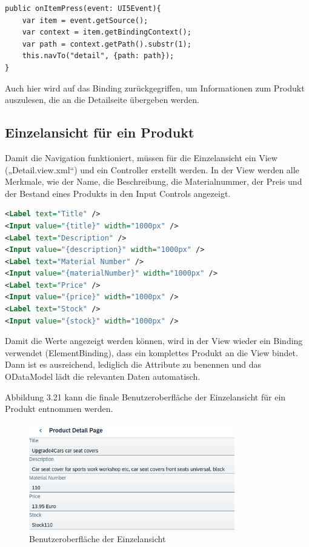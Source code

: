 \begin{lstlisting}[emph={event, UI5Event, listItem, detail, path}]
public onItemPress(event: UI5Event){
    var item = event.getSource();
    var context = item.getBindingContext();
    var path = context.getPath().substr(1);
    this.navTo("detail", {path: path});
}
\end{lstlisting}

Auch hier wird auf das Binding zurückgegriffen, um Informationen zum Produkt auszulesen, die an die Detailseite übergeben werden.

\subsection{Einzelansicht für ein Produkt}
Damit die Navigation funktioniert, müssen für die Einzelansicht ein View („Detail.view.xml“) und ein Controller erstellt werden. In der View werden alle Merkmale, wie der Name, die Beschreibung, die Materialnummer, der Preis und der Bestand eines Produkts in den Input Controls angezeigt.

\begin{lstlisting}[language=XML]
<Label text="Title" />    		
<Input value="{title}" width="1000px" />
<Label text="Description" /> 		
<Input value="{description}" width="1000px" />
<Label text="Material Number" />	
<Input value="{materialNumber}" width="1000px" />
<Label text="Price" />			
<Input value="{price}" width="1000px" />
<Label text="Stock" />		
<Input value="{stock}" width="1000px" />
\end{lstlisting}
Damit die Werte angezeigt werden können, wird in der View wieder ein Binding verwendet (ElementBinding), dass ein komplettes Produkt an die View bindet. Dann ist es ausreichend, lediglich die Attribute zu benennen und das ODataModel lädt die relevanten Daten automatisch.

Abbildung 3.21 kann die finale Benutzeroberfläche der Einzelansicht für ein Produkt entnommen werden.
\begin{figure}[htbp]
 \centering
 \includegraphics[width=0.8\textwidth]{Bilder/ui5 freestyle/3_21_Einzelansicht.png}
 \caption{Benutzeroberfläche der Einzelansicht}
\end{figure}

